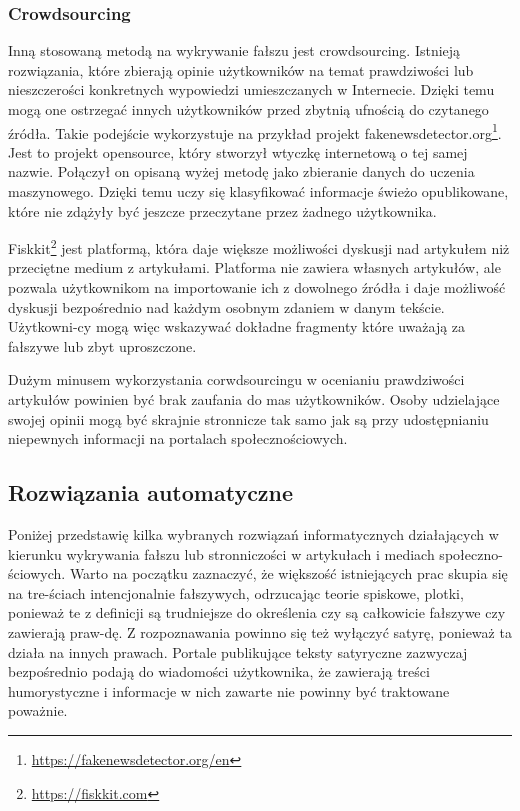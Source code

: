 \subsubsection{Crowdsourcing}
Inną stosowaną metodą na wykrywanie fałszu jest crowdsourcing. Istnieją rozwiązania, które zbierają opinie użytkowników na temat prawdziwości lub nieszczerości konkretnych wypowiedzi umieszczanych w Internecie. Dzięki temu mogą one ostrzegać innych użytkowników przed zbytnią ufnością do czytanego źródła. Takie podejście wykorzystuje na przykład projekt fakenewsdetector.org\footnote{\url{https://fakenewsdetector.org/en}}. Jest to projekt opensource, który stworzył wtyczkę internetową o tej samej nazwie. Połączył on opisaną wyżej metodę jako zbieranie danych do uczenia maszynowego. Dzięki temu uczy się klasyfikować informacje świeżo opublikowane, które nie zdążyły być jeszcze przeczytane przez żadnego użytkownika. 
\par Fiskkit\footnote{\url{https://fiskkit.com}} jest platformą, która daje większe możliwości dyskusji nad artykułem niż przeciętne medium z artykułami. Platforma nie zawiera własnych artykułów, ale pozwala użytkownikom na importowanie ich z dowolnego źródła i daje możliwość dyskusji bezpośrednio nad każdym osobnym zdaniem w danym tekście. Użytkowni-cy mogą więc wskazywać dokładne fragmenty które uważają za fałszywe lub zbyt uproszczone.
\par Dużym minusem wykorzystania corwdsourcingu w ocenianiu prawdziwości artykułów powinien być brak zaufania do mas użytkowników. Osoby udzielające swojej opinii mogą być skrajnie stronnicze tak samo jak są przy udostępnianiu niepewnych informacji na portalach społecznościowych.

\subsection{Rozwiązania automatyczne}
Poniżej przedstawię kilka wybranych rozwiązań informatycznych działających w kierunku wykrywania fałszu lub stronniczości w artykułach i mediach społeczno-ściowych. 
Warto na początku zaznaczyć, że większość istniejących prac skupia się na tre-ściach intencjonalnie fałszywych, odrzucając teorie spiskowe, plotki, ponieważ te z definicji są trudniejsze do określenia czy są całkowicie fałszywe czy zawierają praw-dę. Z rozpoznawania powinno się też wyłączyć satyrę, ponieważ ta działa na innych prawach. Portale publikujące teksty satyryczne zazwyczaj bezpośrednio podają do wiadomości użytkownika, że zawierają treści humorystyczne i informacje w nich zawarte nie powinny być traktowane poważnie.

